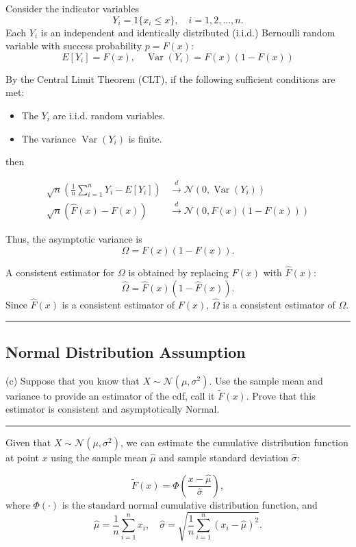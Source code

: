 \documentclass{article}
\newenvironment{colorparagraph}[1]{\par\color{#1}}{\par}
\begin{document}
Consider the indicator variables
\[
Y_i = 1\{ x_i \leq x \}, \quad i = 1, 2, \dots, n.
\]
Each \( Y_i \) is an independent and identically distributed (i.i.d.) Bernoulli random variable with success probability \( p = F(x) \):
\[
E[Y_i] = F(x), \quad \operatorname{Var}(Y_i) = F(x)(1 - F(x))
\]

By the Central Limit Theorem (CLT), if the following sufficient conditions are met:
\begin{itemize}
    \item The \( Y_i \) are i.i.d. random variables.
    \item The variance \( \operatorname{Var}(Y_i) \) is finite.
\end{itemize}
then

$$
\begin{aligned}
  \sqrt{n}\left( \frac{1}{n} \sum_{i=1}^n Y_i - E[Y_i] \right) &\xrightarrow{d} \mathcal{N}(0, \operatorname{Var}(Y_i)) \\
  \sqrt{n}(\hat{F}(x) - F(x)) &\xrightarrow{d} \mathcal{N}\left( 0, F(x)(1 - F(x)) \right)
\end{aligned}
$$

Thus, the asymptotic variance is
\[
\Omega = F(x)(1 - F(x)).
\]

A consistent estimator for \( \Omega \) is obtained by replacing \( F(x) \) with \( \hat{F}(x) \):
\[
\hat{\Omega} = \hat{F}(x)\left( 1 - \hat{F}(x) \right).
\]
Since \( \hat{F}(x) \) is a consistent estimator of \( F(x) \), \( \hat{\Omega} \) is a consistent estimator of \( \Omega \).

\begin{colorparagraph}{questioncolor}
\label{q2c}
\rule{\textwidth}{0.5pt}
\subsection{Normal Distribution Assumption}
(c) Suppose that you know that \( X \sim \mathcal{N}(\mu, \sigma^2) \). Use the sample mean and variance to provide an estimator of the cdf, call it \( \tilde{F}(x) \). Prove that this estimator is consistent and asymptotically Normal.

\rule{\textwidth}{0.5pt}
\end{colorparagraph}

Given that \( X \sim \mathcal{N}(\mu, \sigma^2) \), we can estimate the cumulative distribution function at point \( x \) using the sample mean \( \hat{\mu} \) and sample standard deviation \( \hat{\sigma} \):

\[
\tilde{F}(x) = \Phi\left( \frac{x - \hat{\mu}}{\hat{\sigma}} \right),
\]
where \( \Phi(\cdot) \) is the standard normal cumulative distribution function, and
\[
\hat{\mu} = \frac{1}{n} \sum_{i=1}^n x_i, \quad \hat{\sigma} = \sqrt{\frac{1}{n} \sum_{i=1}^n (x_i - \hat{\mu})^2}.
\]
\end{document}
